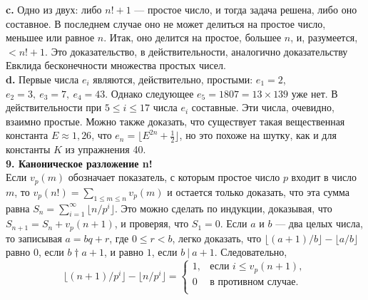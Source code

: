 \documentclass{mai_book}
\begin{document}
\noindent\hspace*{15pt}\textbf{c.} Одно из двух: либо $n!+1$ — простое число, и тогда задача реше­на,\linebreak
либо оно составное. В последнем случае оно не может делиться на\linebreak
простое число, меньшее или равное $n$. Итак, оно делится на простое, большее $n$, и, разумеется, $<n!+1$. Это доказательство, в действитель­ности, аналогично доказательству Евклида бесконечности множества простых чисел.\newline
\\
\hspace*{15pt}\textbf{d.} Первые числа $e_i$ являются, действительно, простыми: $e_1=2$,\linebreak
$e_2=3,~e_3=7,~e_4=43$. Однако следующее\:\: $e_5=1807=13\times139$\:\: уже нет.\linebreak
В действительности при $5\leqslant i\leqslant17$ числа $e_i$ составные. Эти числа, очевидно,\linebreak
взаимно простые. Можно также доказать, что существует такая\linebreak
вещественная константа $E\approx1,26$, что $e_n=\lfloor E^{2n}+\frac{1}{2}\rfloor$, но это похоже\linebreak
на шутку, как и для константы $K$ из упражнения 40.\newline
\\
\noindent\textbf{9. Каноническое разложение n! } \newline 
\\
\hspace*{15pt}Если $v_p(m)$ обозначает показатель, с которым простое число $p$ вхо­дит\linebreak
в число $m$, то $v_p(n!)=\sum_{1\leqslant m\leqslant n}v_p(m)$ и остается только доказать, что\linebreak
эта сумма равна $S_n=\sum^{\infty}_{i=1}\lfloor n/p^i\rfloor$. Это можно сделать по индук­ции,\linebreak
доказывая, что $S_{n+1}=S_n+v_p(n+1)$, и проверяя, что $S_1=0$. Если $a$ и $b$\linebreak
— два целых числа, то записывая $a=bq+r$, где $0\leqslant r<b$, легко доказать,\linebreak
что $\lfloor(a+1)/b\rfloor-\lfloor a/b\rfloor$ равно $0$, если $b\dagger a+1$, и равно $1$, если $b~|~a+1$.\linebreak
Следовательно,
\begin{equation*}\lfloor (n+1)/p^i\rfloor - \lfloor n/p^i\rfloor =
\begin{cases}
	1,& \text{если }i\leqslant v_p(n+1),\\
	0& \text{в противном случае.}\\
\end{cases}
\end{equation*}
\end{document}
